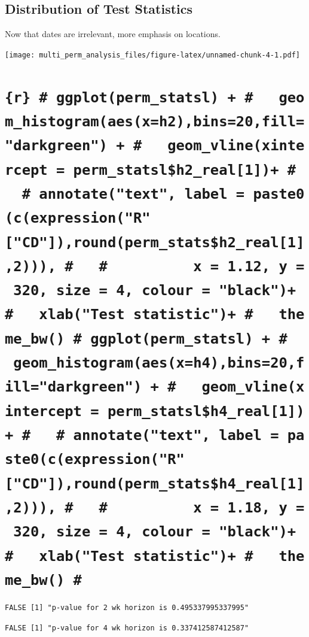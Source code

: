 \documentclass[
]{article}
\begin{document}
\hypertarget{distribution-of-test-statistics}{%
\subsection{Distribution of Test
Statistics}\label{distribution-of-test-statistics}}

Now that dates are irrelevant, more emphasis on locations.

\texttt{[image: multi\_perm\_analysis\_files/figure-latex/unnamed-chunk-4-1.pdf]}

\hypertarget{r-ggplotperm_statsl-geom_histogramaesxh2bins20filldarkgreen-geom_vlinexintercept-perm_statslh2_real1-annotatetext-label-paste0cexpressionrcdroundperm_statsh2_real12-x-1.12-y-320-size-4-colour-black-xlabtest-statistic-theme_bw-ggplotperm_statsl-geom_histogramaesxh4bins20filldarkgreen-geom_vlinexintercept-perm_statslh4_real1-annotatetext-label-paste0cexpressionrcdroundperm_statsh4_real12-x-1.18-y-320-size-4-colour-black-xlabtest-statistic-theme_bw}{%
\section{\texorpdfstring{\texttt{\{r\}\ \#\ ggplot(perm\_statsl)\ +\ \#\ \ \ geom\_histogram(aes(x=h2),bins=20,fill="darkgreen")\ +\ \#\ \ \ geom\_vline(xintercept\ =\ perm\_statsl\$h2\_real{[}1{]})+\ \#\ \ \ \#\ annotate("text",\ label\ =\ paste0(c(expression("R"{[}"CD"{]}),round(perm\_stats\$h2\_real{[}1{]},2))),\ \#\ \ \ \#\ \ \ \ \ \ \ \ \ \ x\ =\ 1.12,\ y\ =\ 320,\ size\ =\ 4,\ colour\ =\ "black")+\ \#\ \ \ xlab("Test\ statistic")+\ \#\ \ \ theme\_bw()\ \#\ ggplot(perm\_statsl)\ +\ \#\ \ \ geom\_histogram(aes(x=h4),bins=20,fill="darkgreen")\ +\ \#\ \ \ geom\_vline(xintercept\ =\ perm\_statsl\$h4\_real{[}1{]})+\ \#\ \ \ \#\ annotate("text",\ label\ =\ paste0(c(expression("R"{[}"CD"{]}),round(perm\_stats\$h4\_real{[}1{]},2))),\ \#\ \ \ \#\ \ \ \ \ \ \ \ \ \ x\ =\ 1.18,\ y\ =\ 320,\ size\ =\ 4,\ colour\ =\ "black")+\ \#\ \ \ xlab("Test\ statistic")+\ \#\ \ \ theme\_bw()\ \#}}{\{r\} \# ggplot(perm\_statsl) + \#   geom\_histogram(aes(x=h2),bins=20,fill="darkgreen") + \#   geom\_vline(xintercept = perm\_statsl\$h2\_real{[}1{]})+ \#   \# annotate("text", label = paste0(c(expression("R"{[}"CD"{]}),round(perm\_stats\$h2\_real{[}1{]},2))), \#   \#          x = 1.12, y = 320, size = 4, colour = "black")+ \#   xlab("Test statistic")+ \#   theme\_bw() \# ggplot(perm\_statsl) + \#   geom\_histogram(aes(x=h4),bins=20,fill="darkgreen") + \#   geom\_vline(xintercept = perm\_statsl\$h4\_real{[}1{]})+ \#   \# annotate("text", label = paste0(c(expression("R"{[}"CD"{]}),round(perm\_stats\$h4\_real{[}1{]},2))), \#   \#          x = 1.18, y = 320, size = 4, colour = "black")+ \#   xlab("Test statistic")+ \#   theme\_bw() \#}}\label{r-ggplotperm_statsl-geom_histogramaesxh2bins20filldarkgreen-geom_vlinexintercept-perm_statslh2_real1-annotatetext-label-paste0cexpressionrcdroundperm_statsh2_real12-x-1.12-y-320-size-4-colour-black-xlabtest-statistic-theme_bw-ggplotperm_statsl-geom_histogramaesxh4bins20filldarkgreen-geom_vlinexintercept-perm_statslh4_real1-annotatetext-label-paste0cexpressionrcdroundperm_statsh4_real12-x-1.18-y-320-size-4-colour-black-xlabtest-statistic-theme_bw}}

\begin{verbatim}
FALSE [1] "p-value for 2 wk horizon is 0.495337995337995"
\end{verbatim}

\begin{verbatim}
FALSE [1] "p-value for 4 wk horizon is 0.337412587412587"
\end{verbatim}
\end{document}
